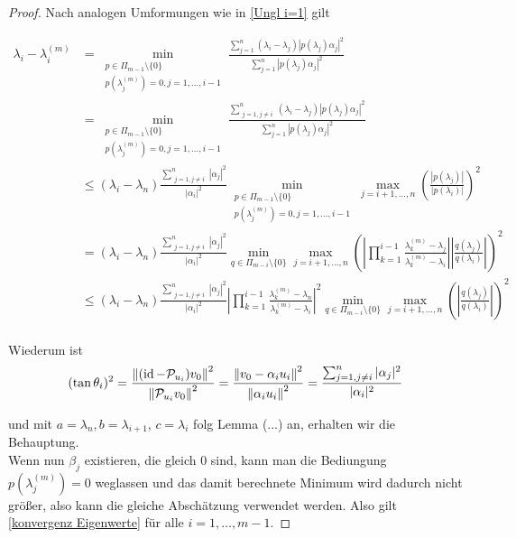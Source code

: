 \documentclass{article}
\begin{document}
\begin{theorem}
\begin{proof}
	Nach analogen Umformungen wie in \ref{Ungl i=1} gilt

	\begin{equation*}
		\begin{aligned}
			\lambda_i - \lambda_i^{(m)} &= \min_{\substack{p\in \Pi_{m-1}\setminus \{0\} \\ p(\lambda_j^{(m)}) = 0, j = 1,\dots,i-1}} \frac{\sum_{j=1}^{n} (\lambda_i - \lambda_j)|p(\lambda_j)\alpha_j|^2}{\sum_{j=1}^{n} |p(\lambda_j)\alpha_j|^2} \\
			&= \min_{\substack{p\in \Pi_{m-1}\setminus \{0\} \\ p(\lambda_j^{(m)}) = 0, j = 1,\dots,i-1}} \frac{\sum_{\substack{j=1, j\neq i}}^{n} (\lambda_i - \lambda_j)|p(\lambda_j)\alpha_j|^2}{\sum_{j=1}^{n} |p(\lambda_j)\alpha_j|^2} \\
			& \le (\lambda_i - \lambda_n) \frac{\sum_{\substack{j=1, j\neq i}}^{n} |\alpha_j|^2}{|\alpha_i|^2} \min_{\substack{p\in \Pi_{m-1}\setminus \{0\} \\ p(\lambda_j^{(m)}) = 0, j = 1,\dots,i-1}} \max_{j=i+1,\dots,n} \left(\frac{|p(\lambda_j)|}{|p(\lambda_i)|}\right)^2 \\
			&= (\lambda_i - \lambda_n) \frac{\sum_{\substack{j=1, j\neq i}}^{n} |\alpha_j|^2}{|\alpha_i|^2} \min_{q\in \Pi_{m-i}\setminus \{0\}} \max_{j=i+1,\dots,n} \left(\left|\prod_{k = 1}^{i-1} \frac{\lambda_k^{(m)} -\lambda_j}{\lambda_k^{(m)} - \lambda_i}\right| \left|\frac{q(\lambda_j)}{q(\lambda_i)}\right|\right)^2 \\
			&\le (\lambda_i - \lambda_n) \frac{\sum_{\substack{j=1, j\neq i}}^{n} |\alpha_j|^2}{|\alpha_i|^2} \left|\prod_{k = 1}^{i-1} \frac{\lambda_k^{(m)} -\lambda_n}{\lambda_k^{(m)} - \lambda_i}\right|^2 \min_{q\in \Pi_{m-i}\setminus \{0\}} \max_{j=i+1,\dots,n} \left(\left|\frac{q(\lambda_j)}{q(\lambda_i)}\right|\right)^2 \\
		\end{aligned}
	\end{equation*}

	Wiederum ist
	\begin{equation*}
		(\tan\theta_i)^2 = \frac{{\left \| (\operatorname{id} - \mathcal{P}_{u_i})v_0 \right \|}_{}^2}{{\left \|  \mathcal{P}_{u_i}v_0 \right \|}_{}^2} = \frac{{\left \| v_0 - \alpha_i u_i \right \|}_{}^2}{{\left \| \alpha_i u_i \right \|}_{}^2} = \frac{\sum_{\substack{j=1, j\neq i}}^{n} |\alpha_j|^2}{|\alpha_i|^2}
	\end{equation*}

	und  mit $a = \lambda_n, b= \lambda_{i+1}$, $c = \lambda_i$ folg Lemma (...) an, erhalten wir die Behauptung.\\

	Wenn nun $\beta_j$ existieren, die gleich 0 sind, kann man die Bediungung $p(\lambda_j^{(m)}) = 0$ weglassen und das damit berechnete Minimum wird dadurch nicht größer, also kann die gleiche Abschätzung verwendet werden.
	Also gilt \ref{konvergenz Eigenwerte} für alle $i = 1, \dots, m-1$.
	\end{proof}
\end{theorem}
\end{document}
